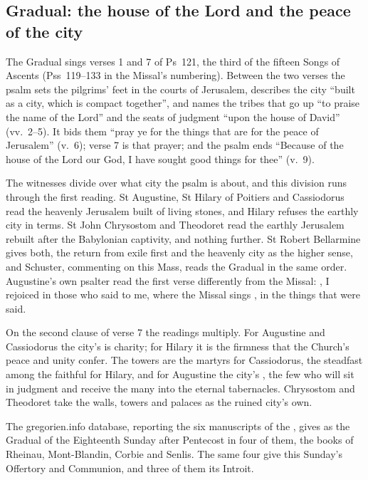\subsection{Gradual: the house of the Lord and the peace of the city}

The Gradual sings verses 1 and 7 of Ps~121, the third of the fifteen Songs of
Ascents (Pss~119--133 in the Missal's numbering). Between the two verses the
psalm sets the pilgrims' feet in the courts of Jerusalem, describes the city
``built as a city, which is compact together'', and names the tribes that go
up ``to praise the name of the Lord'' and the seats of judgment ``upon the
house of David'' (vv.~2--5). It bids them ``pray ye for the things that are
for the peace of Jerusalem'' (v.~6); verse 7 is that prayer; and the psalm
ends ``Because of the house of the Lord our God, I have sought good things for
thee'' (v.~9).

The witnesses divide over what city the psalm is about, and this division runs
through the first reading. St Augustine, St Hilary of Poitiers and Cassiodorus
read the heavenly Jerusalem built of living stones, and Hilary refuses the
earthly city in terms. St John Chrysostom and Theodoret read the earthly
Jerusalem rebuilt after the Babylonian captivity, and nothing further. St
Robert Bellarmine gives both, the return from exile first and the heavenly
city as the higher sense, and Schuster, commenting on this Mass, reads the
Gradual in the same order. Augustine's own psalter read the first verse
differently from the Missal: ,
I rejoiced in those who said to me, where the Missal sings , in the things that were said.

On the second clause of verse 7 the readings multiply. For Augustine and
Cassiodorus the city's  is charity; for Hilary it is the
firmness that the Church's peace and unity confer. The towers are the martyrs
for Cassiodorus, the steadfast among the faithful for Hilary, and for Augustine
the city's , the few who will sit in judgment and receive the
many into the eternal tabernacles. Chrysostom and Theodoret take the walls,
towers and palaces as the ruined city's own.

The gregorien.info database, reporting the six manuscripts of the
, gives  as the
Gradual of the Eighteenth Sunday after Pentecost in four of them, the books of
Rheinau, Mont-Blandin, Corbie and Senlis. The same four give this Sunday's
Offertory and Communion, and three of them its Introit.

